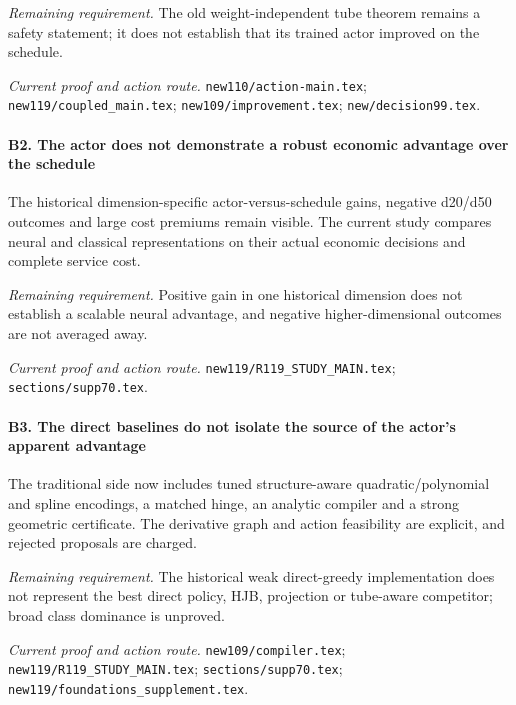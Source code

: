 \par\emph{Remaining requirement.} The old weight-independent tube theorem remains a safety statement; it does not establish that its trained actor improved on the schedule.

\par\emph{Current proof and action route.} \nolinkurl{new110/action-main.tex}; \nolinkurl{new119/coupled_main.tex}; \nolinkurl{new109/improvement.tex}; \nolinkurl{new/decision99.tex}.

\paragraph{B2. The actor does not demonstrate a robust economic advantage over the schedule}

The historical dimension-specific actor-versus-schedule gains, negative d20/d50 outcomes and large cost premiums remain visible. The current study compares neural and classical representations on their actual economic decisions and complete service cost.

\par\emph{Remaining requirement.} Positive gain in one historical dimension does not establish a scalable neural advantage, and negative higher-dimensional outcomes are not averaged away.

\par\emph{Current proof and action route.} \nolinkurl{new119/R119_STUDY_MAIN.tex}; \nolinkurl{sections/supp70.tex}.

\paragraph{B3. The direct baselines do not isolate the source of the actor's apparent advantage}

The traditional side now includes tuned structure-aware quadratic/\allowbreak{}polynomial and spline encodings, a matched hinge, an analytic compiler and a strong geometric certificate. The derivative graph and action feasibility are explicit, and rejected proposals are charged.

\par\emph{Remaining requirement.} The historical weak direct-greedy implementation does not represent the best direct policy, HJB, projection or tube-aware competitor; broad class dominance is unproved.

\par\emph{Current proof and action route.} \nolinkurl{new109/compiler.tex}; \nolinkurl{new119/R119_STUDY_MAIN.tex}; \nolinkurl{sections/supp70.tex}; \nolinkurl{new119/foundations_supplement.tex}.

